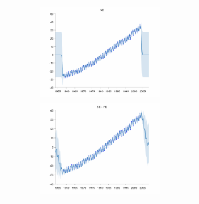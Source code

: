 \documentclass[twoside]{article}
\begin{document}
\begin{figure}[h!]
\centering
\newcommand{\wmg}{8cm}  %
\newcommand{\hmg}{4cm}  %
\begin{tabular}{c}
 \includegraphics[width=\wmg,height=\hmg]{../figures/decomposition/03-mauna2003_max_level_0/03-mauna2003_all} \\ 
 \includegraphics[width=\wmg,height=\hmg]{../figures/decomposition/03-mauna2003_max_level_1/03-mauna2003_all} \\

\end{tabular}
\end{figure}
\end{document}
